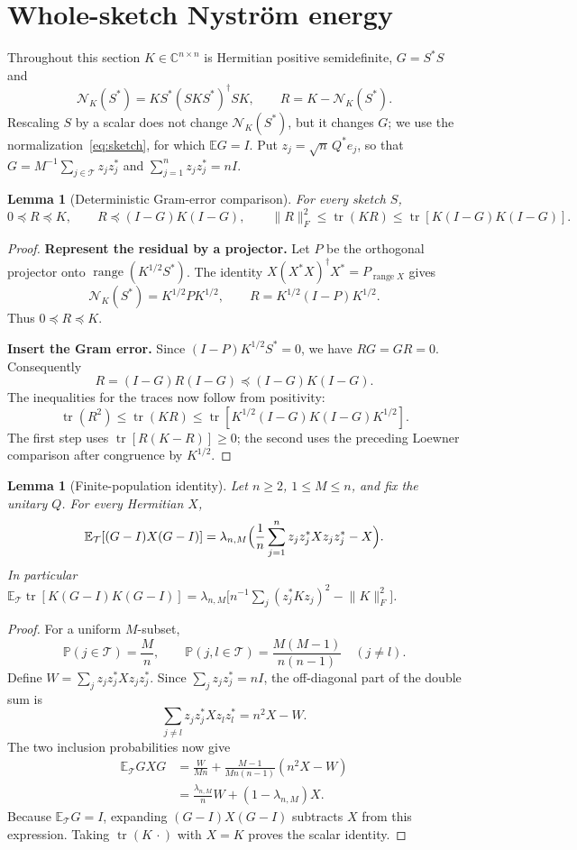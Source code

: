 \documentclass[11pt,a4paper]{article}
\newtheorem{lemma}[theorem]{Lemma}
\theoremstyle{definition}
\theoremstyle{remark}
\numberwithin{equation}{section}
\newcommand{\E}{\mathbb E}
\newcommand{\Prob}{\mathbb P}
\newcommand{\C}{\mathbb C}
\newcommand{\tr}{\operatorname{tr}}
\newcommand{\range}{\operatorname{range}}
\newcommand{\norm}[1]{\lVert#1\rVert}
\newcommand{\Nys}{\mathcal N}
\newcommand{\cT}{\mathcal T}
\begin{document}
\section{Whole-sketch Nystr\"om energy}\label{sec:nystrom}

Throughout this section $K\in\C^{n\times n}$ is Hermitian positive
semidefinite, $G=S^*S$ and
\[
 \Nys_K(S^*)=KS^*(SKS^*)^\dagger SK,\qquad R=K-\Nys_K(S^*).
\]
Rescaling $S$ by a scalar does not change $\Nys_K(S^*)$, but it changes $G$;
we use the normalization~\eqref{eq:sketch}, for which $\E G=I$. Put
$z_j=\sqrt n\,Q^*e_j$, so that $G=M^{-1}\sum_{j\in\cT}z_jz_j^*$ and
$\sum_{j=1}^nz_jz_j^*=nI$.

\begin{lemma}[Deterministic Gram-error comparison]\label{lem:det}
For every sketch $S$,
\[
 0\preceq R\preceq K,\qquad R\preceq(I-G)K(I-G),\qquad
 \norm R_F^2\le\tr(KR)\le\tr[K(I-G)K(I-G)] .
\]
\end{lemma}
\begin{proof}
\noindent\textbf{Represent the residual by a projector.}\enspace
Let $P$ be the orthogonal projector onto $\range(K^{1/2}S^*)$.
The identity $X(X^*X)^\dagger X^*=P_{\range X}$ gives
\[
 \Nys_K(S^*)=K^{1/2}PK^{1/2},\qquad
 R=K^{1/2}(I-P)K^{1/2}.
\]
Thus $0\preceq R\preceq K$.

\noindent\textbf{Insert the Gram error.}\enspace
Since $(I-P)K^{1/2}S^*=0$, we have $RG=GR=0$. Consequently
\[
 R=(I-G)R(I-G)\preceq(I-G)K(I-G).
\]
The inequalities for the traces now follow from positivity:
\[
 \tr(R^2)\le\tr(KR)
 \le\tr\!\left[K^{1/2}(I-G)K(I-G)K^{1/2}\right].
\]
The first step uses $\tr[R(K-R)]\ge0$; the second uses the preceding
Loewner comparison after congruence by $K^{1/2}$.
\end{proof}

\begin{lemma}[Finite-population identity]\label{lem:population}
Let $n\ge2$, $1\le M\le n$, and fix the unitary $Q$. For every Hermitian $X$,
\[
 \E_\cT[(G-I)X(G-I)]=\lambda_{n,M}\Bigl(\frac1n\sum_{j=1}^nz_jz_j^*Xz_jz_j^*-X\Bigr).
\]
In particular
$\E_\cT\tr[K(G-I)K(G-I)]=\lambda_{n,M}\bigl[n^{-1}\sum_j(z_j^*Kz_j)^2-\norm K_F^2\bigr]$.
\end{lemma}
\begin{proof}

For a uniform $M$-subset,
\[
 \Prob(j\in\cT)=\frac Mn,\qquad
 \Prob(j,l\in\cT)=\frac{M(M-1)}{n(n-1)}\quad(j\ne l).
\]
Define $W=\sum_jz_jz_j^*Xz_jz_j^*$. Since
$\sum_jz_jz_j^*=nI$, the off-diagonal part of the double sum is
\[
 \sum_{j\ne l}z_jz_j^*Xz_lz_l^*=n^2X-W.
\]
The two inclusion probabilities now give
\begin{align*}
 \E_\cT GXG
 &=\frac{W}{Mn}+\frac{M-1}{Mn(n-1)}(n^2X-W)\\
 &=\frac{\lambda_{n,M}}nW+(1-\lambda_{n,M})X.
\end{align*}
Because $\E_\cT G=I$, expanding $(G-I)X(G-I)$ subtracts $X$ from this
expression. Taking $\tr(K\,\cdot)$ with $X=K$ proves the scalar identity.

\end{proof}
\end{document}
